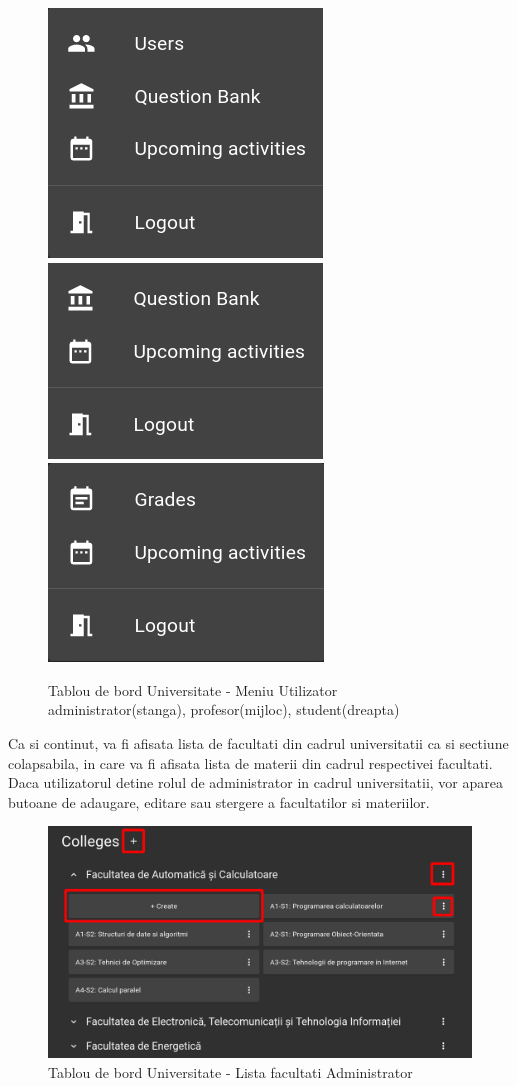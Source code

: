 \documentclass[12pt, a4paper, oneside, romanian]{teza-upb}
\begin{document}
\begin{figure}[H]
\centering
\includegraphics*[width=0.32\columnwidth]{tablou-de-bord-universitate-meniu-utilizator-administrator}
\includegraphics*[width=0.32\columnwidth]{tablou-de-bord-universitate-meniu-utilizator-profesor}
\includegraphics*[width=0.32\columnwidth]{tablou-de-bord-universitate-meniu-utilizator-student}
\caption{Tablou de bord Universitate - Meniu Utilizator administrator(stanga), profesor(mijloc), student(dreapta)}
\label{tablou-de-bord-universitate-meniu-utilizator-administrator}
\end{figure}

Ca si continut, va fi afisata lista de facultati din cadrul universitatii ca si sectiune colapsabila, in care va fi afisata lista de materii din cadrul respectivei facultati. Daca utilizatorul detine rolul de administrator in cadrul universitatii, vor aparea butoane de adaugare, editare sau stergere a facultatilor si materiilor.

\begin{figure}[H]
\centering
\includegraphics*[width=\columnwidth]{tablou-de-bord-universitate-lista-facultati-administrator}
\caption{Tablou de bord Universitate - Lista facultati Administrator}
\label{tablou-de-bord-universitate-lista-facultati-administrator}
\end{figure}
\end{document}
